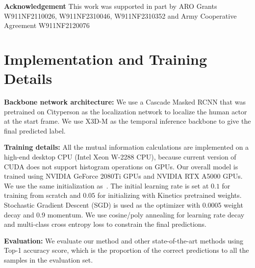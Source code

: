 \documentclass[10pt,twocolumn,letterpaper]{article}
\begin{document}
{\textbf{Acknowledgement} This work was supported in part by ARO Grants W911NF2110026, W911NF2310046,  W911NF2310352  and Army Cooperative Agreement W911NF2120076
\label{sec:conclusion}

 
{\small


}

\clearpage
\appendix
\label{sec:appendix}


\section{Implementation and Training Details}\label{sec:imple}

\noindent  \textbf{Backbone network architecture:} We use a Cascade Masked RCNN\cite{hasan2021generalizable} that was pretrained on Cityperson\cite{Zhang2017CityPersonsAD} as the localization network to localize the human actor at the start frame. We use X3D-M\cite{feichtenhofer2020x3d} as the temporal inference backbone to give the final predicted label.

\noindent  \textbf{Training details:} All the mutual information calculations are implemented on a high-end desktop CPU (Intel Xeon W-2288 CPU), because current version of CUDA does not support histogram operations on GPUs. Our overall model is trained using NVIDIA GeForce 2080Ti GPUs and NVIDIA RTX A5000 GPUs. We use the same initialization as~\cite{divya2022far}. The initial learning rate is set at $0.1$ for training from scratch and $0.05$ for initializing with Kinetics pretrained weights. Stochastic Gradient Descent (SGD) is used as the optimizer with 0.0005 weight decay and 0.9 momentum. We use cosine/poly annealing for learning rate decay and multi-class cross entropy loss to constrain the final predictions.

\noindent  \textbf{Evaluation:} We evaluate our method and other state-of-the-art methods using Top-1 accuracy score, which is the proportion of the correct predictions to all the samples in the evaluation set.



















}
\end{document}

